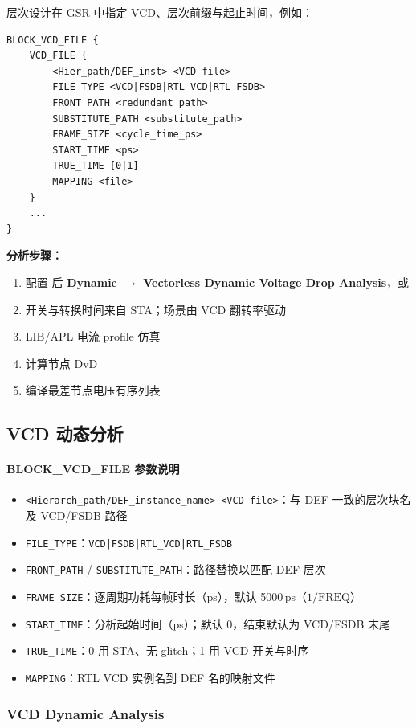 层次设计在 GSR 中指定 VCD、层次前缀与起止时间，例如：
\begin{lstlisting}
BLOCK_VCD_FILE {
    VCD_FILE {
        <Hier_path/DEF_inst> <VCD file>
        FILE_TYPE <VCD|FSDB|RTL_VCD|RTL_FSDB>
        FRONT_PATH <redundant_path>
        SUBSTITUTE_PATH <substitute_path>
        FRAME_SIZE <cycle_time_ps>
        START_TIME <ps>
        TRUE_TIME [0|1]
        MAPPING <file>
    }
    ...
}
\end{lstlisting}

\textbf{分析步骤：}
\begin{enumerate}
  \item 配置  后 \textbf{Dynamic $\rightarrow$ Vectorless Dynamic Voltage Drop Analysis}，或 
  \item 开关与转换时间来自 STA；场景由 VCD 翻转率驱动
  \item LIB/APL 电流 profile 仿真
  \item 计算节点 DvD
  \item 编译最差节点电压有序列表
\end{enumerate}

\subsection{VCD 动态分析}
\paragraph{BLOCK\_VCD\_FILE 参数说明}
\begin{itemize}
  \item \texttt{<Hierarch\_path/DEF\_instance\_name> <VCD file>}：与 DEF 一致的层次块名及 VCD/FSDB 路径
  \item \texttt{FILE_TYPE}：\texttt{VCD|FSDB|RTL\_VCD|RTL\_FSDB}
  \item \texttt{FRONT_PATH} / \texttt{SUBSTITUTE_PATH}：路径替换以匹配 DEF 层次
  \item \texttt{FRAME_SIZE}：逐周期功耗每帧时长（ps），默认 5000\,ps（$1/\text{FREQ}$）
  \item \texttt{START_TIME}：分析起始时间（ps）；默认 0，结束默认为 VCD/FSDB 末尾
  \item \texttt{TRUE_TIME}：0 用 STA、无 glitch；1 用 VCD 开关与时序
  \item \texttt{MAPPING}：RTL VCD 实例名到 DEF 名的映射文件
\end{itemize}

\subsubsection*{VCD Dynamic Analysis}

